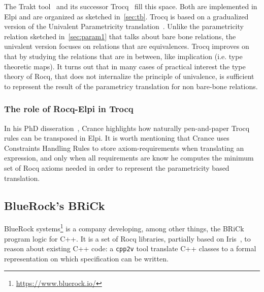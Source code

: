\documentclass[a4paper, 11pt]{book}
\begin{document}
The Trakt tool~\cite{DBLP:conf/cpp/Blot0CPKMV23} and its successor
Trocq~\cite{10.1007/978-3-031-57262-3_10} fill this space. Both
are implemented in Elpi and are organized as sketched in~\cref{sec:tb}.
Trocq is based on a gradualized version of the Univalent Parametricity
translation~\cite{10.1145/3429979}. Unlike the parametricity relation
sketched in~\cref{sec:param1} that talks about bare bone relations, the univalent
version focuses on relations that are equivalences.
Trocq improves on that by studying the relations that are in between,
like implication (i.e. type theoretic maps).
It turns out that in many cases of practical interest the type
theory of Rocq, that does not internalize the principle of univalence, is
sufficient to represent the result of the parametricy translation
for non bare-bone relations.

\subsubsection{The role of Rocq-Elpi in Trocq}

In his PhD disseration~\cite[Page 115]{enzo}, Crance
highlights how naturally pen-and-paper Trocq rules can be transposed in Elpi.
It is worth mentioning that Crance uses Constraints Handling Rules to
store axiom-requirements when translating an expression, and only when
all requirements are know he computes the minimum set of Rocq axioms
needed in order to represent the parametricity based translation.



\subsection{BlueRock's BRiCk}

BlueRock systems\footnote{\url{https://www.bluerock.io/}} is a company
developing, among other things, the BRiCk program logic for C++.
It is a set of Rocq libraries, partially based on Iris~\cite{10.1145/2676726.2676980,10.1007/978-3-662-54434-1_26},
to reason about existing C++ code: a \texttt{cpp2v} tool translate C++
classes to a formal representation on which specification can be written.
\end{document}
